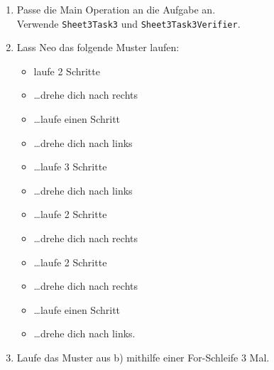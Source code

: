 
\begin{enumerate}
	\item 
		Passe die Main Operation an die Aufgabe an. \\
		Verwende \lstinline{Sheet3Task3} und \lstinline{Sheet3Task3Verifier}.
	\item
		Lass Neo das folgende Muster laufen:
		\begin{itemize}
			\item[] laufe 2 Schritte
			\item[] …drehe dich nach rechts
			\item[] …laufe einen Schritt
			\item[] …drehe dich nach links
			\item[] …laufe 3 Schritte
			\item[] …drehe dich nach links
			\item[] …laufe 2 Schritte
			\item[] …drehe dich nach rechts
			\item[] …laufe 2 Schritte
			\item[] …drehe dich nach rechts
			\item[] …laufe einen Schritt
			\item[] …drehe dich nach links.
		\end{itemize}
	\item
		Laufe das Muster aus b) mithilfe einer For-Schleife 3 Mal.
\end{enumerate}


